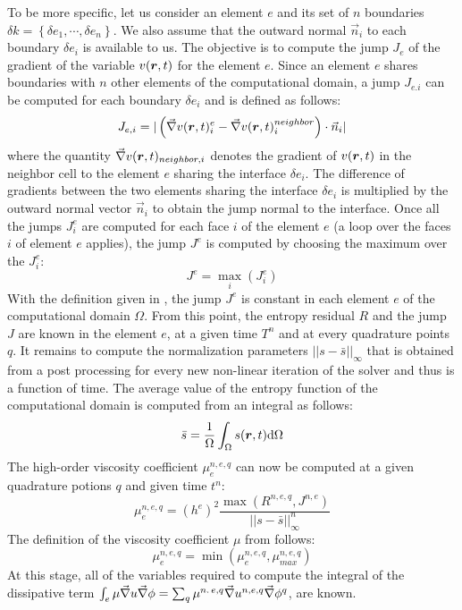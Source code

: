 To be more specific, let us consider an element $e$ and its set of $n$ boundaries $\delta k = \left\{ \delta e_1, \cdots, \delta e_n \right\}$. We also assume that the outward normal $\vec{n}_i$ to each boundary $\delta e_i$ is available to us. The objective is to compute the jump $J_e$ of the gradient of the variable $v(\boldsymbol r,t)$ for the element $e$. Since an element $e$ shares boundaries with $n$ other elements of the computational domain, a jump $J_{e.i}$ can be computed for each boundary $\delta e_i$ and is defined as follows:
%
\begin{equation}\label{eq:jump_def_sct2}
J_{e,i} = | \left( \vec{\nabla} v(\boldsymbol r,t)_{i}^e - \vec{\nabla} v(\boldsymbol r,t)_{i}^{neighbor} \right) \cdot \vec{n}_i |
\end{equation}
% 
where the quantity $\vec{\nabla} v(\boldsymbol r,t)_{neighbor,i}$ denotes the gradient of $v(\boldsymbol r,t)$ in the neighbor cell to the element $e$ sharing the interface $\delta e_i$. The difference of gradients between the two elements sharing the interface $\delta e_i$ is multiplied by the outward normal vector $\vec{n}_i$ to obtain the jump normal to the interface. Once all the jumps $J_{i}^e$ are computed for each face $i$ of the element $e$ (a loop over the faces $i$ of element $e$ applies), the jump $J^e$ is computed by choosing the maximum over the $J_{i}^e$:
%
\begin{equation}\label{eq:jump_def2_sct2}
J^e = \max_i \left( J_{i}^e \right)
\end{equation}
%
With the definition given in , the jump $J^e$ is constant in each element $e$ of the computational domain $\Omega$. From this point, the entropy residual $R$ and the jump $J$ are known in the element $e$, at a given time $T^n$ and at every quadrature points $q$. It remains to compute the normalization parameters $|| s - \bar{s} ||_\infty$ that is obtained from a post processing for every new non-linear iteration of the solver and thus is a function of time. The average value of the entropy function of the computational domain is computed from an integral as follows:
%
\begin{equation}\label{eq:sbar_sct2}
\bar{s} = \frac{1}{\Omega} \int_{\Omega} s(\boldsymbol r,t) \text{d}\Omega
\end{equation}
%   
The high-order viscosity coefficient $\mu_{e}^{n,e,q}$ can now be computed at a given quadrature potions $q$ and given time $t^n$:
%
\begin{equation}\label{eq:visc_ev2_sct2}
\mu_{e}^{n,e,q} = (h^e)^2 \frac{\max \left( R^{n,e,q}, J^{n,e} \right)}{|| s - \bar{s} ||_\infty^n}
\end{equation}
%
The definition of the viscosity coefficient $\mu$ from  follows:
%
\begin{equation}\label{eq:visc2_sct2}
\mu_{e}^{n,e,q} = \min \left( \mu_{e}^{n,e,q}, \mu_{max}^{n,e,q} \right)
\end{equation}
%
At this stage, all of the variables required to compute the integral of the dissipative term $\int_{e} \mu \vec{\nabla} u \vec{\nabla} \phi = \sum_q \mu^{n.\,e,q} \vec{\nabla} u^{n,e,q} \vec{\nabla} \phi^q$, are known.
